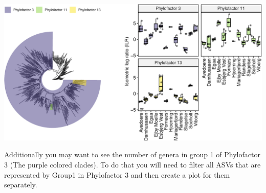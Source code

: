 \documentclass[
]{book}
\begin{document}
\includegraphics{gitbook-demo_files/figure-latex/ILRplotcombined-1.pdf}

Additionally you may want to see the number of genera in group 1 of Phylofactor 3 (The purple colored clades). To do that you will need to filter all ASVs that are represented by Group1 in Phylofactor 3 and then create a plot for them separately.
\end{document}

